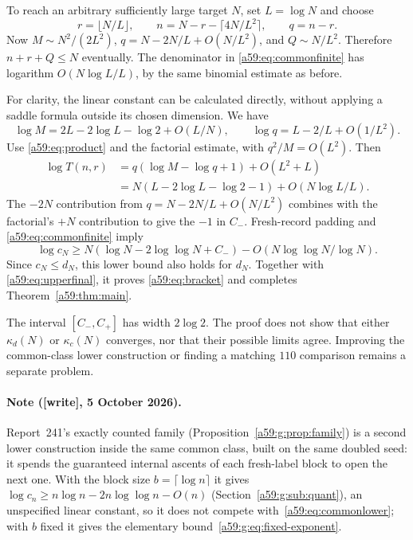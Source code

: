 \documentclass[11pt,letterpaper]{article}
\theoremstyle{remark}\newtheorem{remark}[theorem]{Remark}
\newcommand{\wtag}{\textup{[write]}}
\theoremstyle{remark}\newtheorem{wremark}{Remark}\renewcommand{\thewremark}{W\arabic{wremark}}
\theoremstyle{plain}\newtheorem{wcorollary}[wremark]{Corollary}
\begin{document}
To reach an arbitrary sufficiently large target $N$, set $L=\log N$ and choose
\begin{equation}\label{a59:eq:commonparameters}
 r=\lfloor N/L\rfloor,\qquad
 n=N-r-\lceil4N/L^2\rceil,\qquad q=n-r.
\end{equation}
Now $M\sim N^2/(2L^2)$, $q=N-2N/L+O(N/L^2)$, and $Q\sim N/L^2$. Therefore $n+r+Q\le N$ eventually. The denominator in \eqref{a59:eq:commonfinite} has logarithm $O(N\log L/L)$, by the same binomial estimate as before.

For clarity, the linear constant can be calculated directly, without applying a saddle formula outside its chosen dimension. We have
\[
 \log M=2L-2\log L-\log2+O(L/N),\qquad
 \log q=L-2/L+O(1/L^2).
\]
Use \eqref{a59:eq:product} and the factorial estimate, with $q^2/M=O(L^2)$. Then
\begin{align*}
 \log T(n,r)
 &=q(\log M-\log q+1)+O(L^2+L)\\
 &=N(L-2\log L-\log2-1)+O(N\log L/L).
\end{align*}
The $-2N$ contribution from $q=N-2N/L+O(N/L^2)$ combines with the factorial's $+N$ contribution to give the $-1$ in $C_-$. Fresh-record padding and \eqref{a59:eq:commonfinite} imply
\begin{equation}\label{a59:eq:commonlower}
 \log c_N\ge N(\log N-2\log\log N+C_-)
                   -O(N\log\log N/\log N).
\end{equation}
Since $c_N\le d_N$, this lower bound also holds for $d_N$. Together with \eqref{a59:eq:upperfinal}, it proves \eqref{a59:eq:bracket} and completes Theorem~\ref{a59:thm:main}.

The interval $[C_-,C_+]$ has width $2\log2$. The proof does not show that either $\kappa_d(N)$ or $\kappa_c(N)$ converges, nor that their possible limits agree. Improving the common-class lower construction or finding a matching $110$ comparison remains a separate problem.

\paragraph{Note (\wtag, 5 October 2026).} Report~241's exactly counted
family (Proposition~\ref{a59:g:prop:family}) is a second lower construction
inside the same common class, built on the same doubled seed: it spends the
guaranteed internal ascents of each fresh-label block to open the next one.
With the block size $b=\lceil\log n\rceil$ it gives
$\log c_n\ge n\log n-2n\log\log n-O(n)$ (Section~\ref{a59:g:sub:quant}),
an unspecified linear constant, so it does not compete
with~\eqref{a59:eq:commonlower}; with $b$ fixed it gives the elementary
bound~\eqref{a59:g:eq:fixed-exponent}.
\end{document}

